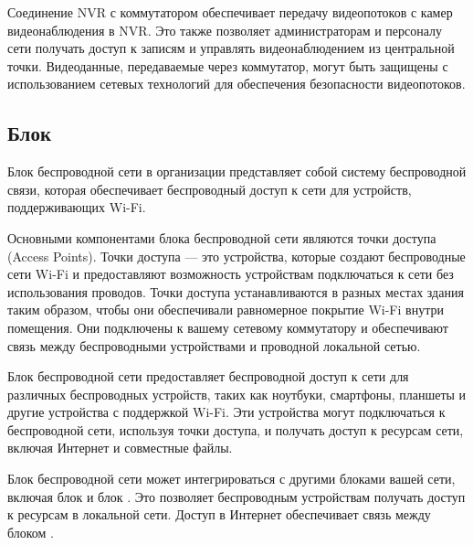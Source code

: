 Соединение NVR с коммутатором обеспечивает передачу видеопотоков с камер видеонаблюдения в NVR.
Это также позволяет администраторам и персоналу сети получать доступ к записям и управлять видеонаблюдением из центральной точки.
Видеоданные, передаваемые через коммутатор, могут быть защищены с использованием сетевых технологий для обеспечения безопасности видеопотоков.

\subsection{Блок \blockAccessPoint}

Блок беспроводной сети в организации представляет собой систему беспроводной связи, 
которая обеспечивает беспроводный доступ к сети для устройств, поддерживающих Wi-Fi.

Основными компонентами блока беспроводной сети являются точки доступа (Access Points). 
Точки доступа --- это устройства, которые создают беспроводные сети Wi-Fi и предоставляют возможность устройствам подключаться к сети без использования проводов.
Точки доступа устанавливаются в разных местах здания таким образом, чтобы они обеспечивали равномерное покрытие Wi-Fi внутри помещения.
Они подключены к вашему сетевому коммутатору и обеспечивают связь между беспроводными устройствами и проводной локальной сетью.

Блок беспроводной сети предоставляет беспроводной доступ к сети для различных беспроводных устройств, 
таких как ноутбуки, смартфоны, планшеты и другие устройства с поддержкой Wi-Fi.
Эти устройства могут подключаться к беспроводной сети, используя точки доступа, и получать доступ к ресурсам сети, 
включая Интернет и совместные файлы.

Блок беспроводной сети может интегрироваться с другими блоками вашей сети, включая блок \blockDevices и блок \blockVideo\@. 
Это позволяет беспроводным устройствам получать доступ к ресурсам в локальной сети. Доступ в Интернет обеспечивает связь между блоком \blockSwith\@.